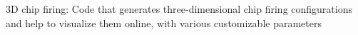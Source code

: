 \documentclass[]{plushcv}
\begin{document}
\begin{minipage}[t]{0.70\textwidth}
\begin{tightemize}
\item 3D chip firing: Code that generates three-dimensional chip firing configurations and help to visualize them online, with various customizable parameters  
\end{tightemize}



%
%

\end{minipage} 
\hfill
\end{document}
